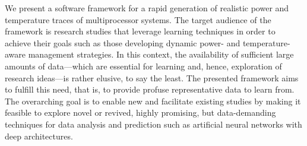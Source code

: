 We present a software framework for a rapid generation of realistic power and
temperature traces of multiprocessor systems. The target audience of the
framework is research studies that leverage learning techniques in order to
achieve their goals such as those developing dynamic power- and
temperature-aware management strategies. In this context, the availability of
sufficient large amounts of data---which are essential for learning and, hence,
exploration of research ideas---is rather elusive, to say the least. The
presented framework aims to fulfill this need, that is, to provide profuse
representative data to learn from. The overarching goal is to enable new and
facilitate existing studies by making it feasible to explore novel or revived,
highly promising, but data-demanding techniques for data analysis and prediction
such as artificial neural networks with deep architectures.

